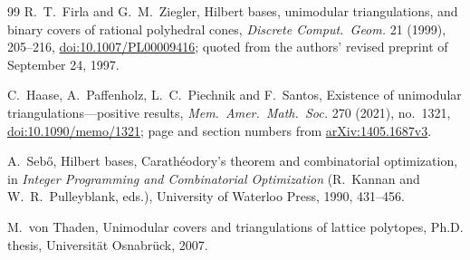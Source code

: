 \documentclass[11pt]{article}
\theoremstyle{definition}
\begin{document}
\begin{thebibliography}{99}
 R.~T.~Firla and G.~M.~Ziegler, Hilbert bases, unimodular
triangulations, and binary covers of rational polyhedral cones,
\emph{Discrete Comput.\ Geom.} 21 (1999), 205--216,
\href{https://doi.org/10.1007/PL00009416}{doi:10.1007/PL00009416}; quoted
from the authors' revised preprint of September 24, 1997.

 C.~Haase, A.~Paffenholz, L.~C.~Piechnik and F.~Santos,
Existence of unimodular triangulations---positive results, \emph{Mem.\
Amer.\ Math.\ Soc.} 270 (2021), no.~1321,
\href{https://doi.org/10.1090/memo/1321}{doi:10.1090/memo/1321}; page and
section numbers from
\href{https://arxiv.org/abs/1405.1687v3}{arXiv:1405.1687v3}.

 A.~Sebő, Hilbert bases, Carathéodory's theorem and
combinatorial optimization, in \emph{Integer Programming and Combinatorial
Optimization} (R.~Kannan and W.~R.~Pulleyblank, eds.), University of
Waterloo Press, 1990, 431--456.

 M.~von Thaden, Unimodular covers and triangulations of lattice
polytopes, Ph.D. thesis, Universität Osnabrück, 2007.
\end{thebibliography}
\end{document}
